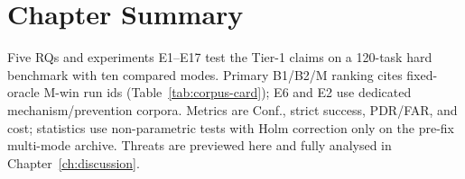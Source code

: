 \section*{Chapter Summary}

Five RQs and experiments E1--E17 test the Tier-1 claims on a 120-task hard
benchmark with ten compared modes.
Primary B1/B2/M ranking cites fixed-oracle M-win run ids
(Table~\ref{tab:corpus-card}); E6 and E2 use dedicated mechanism/prevention
corpora.
Metrics are Conf., strict success, PDR/FAR, and cost; statistics use
non-parametric tests with Holm correction only on the pre-fix multi-mode archive.
Threats are previewed here and fully analysed in Chapter~\ref{ch:discussion}.
